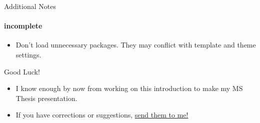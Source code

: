 \documentclass{uic-beamer}
\newcommand{\hrefcol}[2]{\textcolor{cyan}{\href{#1}{#2}}}
\begin{document}
\begin{frame}[fragile]{Additional Notes}
\framesubtitle{incomplete}
\begin{itemize}
\item Don't load unnecessary packages. They may conflict with template and theme settings.
\end{itemize}
\end{frame}

\begin{frame}{Good Luck!}
\begin{itemize}
\item I know enough by now from working on this introduction to make my MS Thesis presentation.
\item If you have corrections or suggestions,
\hrefcol{mailto:stephanie@math.uic.edu}{send them to me!}\quad  
\end{itemize}
\end{frame}

\backmatter
\end{document}
